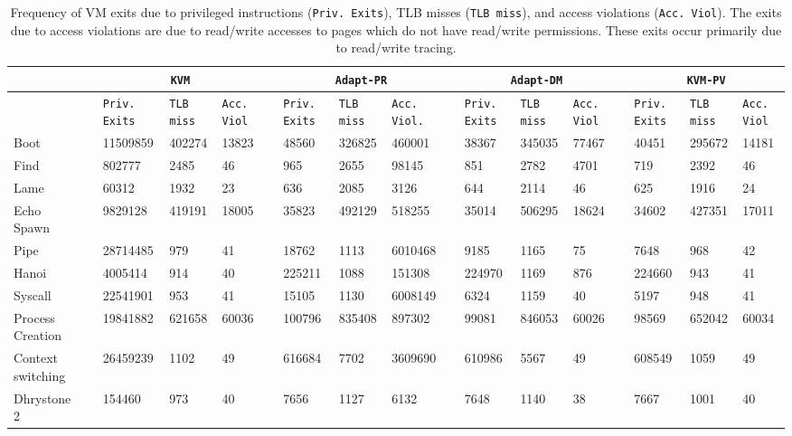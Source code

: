 \begin{center}
\begin{table*}
\centering
\begin{tabular}{
  |p{1.2cm}@{}|@{ }c@{ }|@{}p{0.9cm}|@{}p{1.2cm}|@{}p{1.0cm}@{}|@{ }c@{ }|@{}p{0.8cm}|@{}p{1.2cm}|@{}p{1.0cm}|@{ }c@{ }|@{}p{0.8cm}|@{}p{1.2cm}|@{}p{0.9cm}|@{ }c@{ }|@{}p{0.8cm}|@{}p{1.2cm}|@{}p{0.9cm}@{}|} \hline
	         &  & \multicolumn{3}{c|}{\tt KVM}& & \multicolumn{3}{c|}{\tt Adapt-PR} & & \multicolumn{3}{c|}{\tt Adapt-DM} & & \multicolumn{3}{c|}{\tt KVM-PV} \\ \hline

           &&{\tt Priv. Exits}&{\tt TLB miss}&{\tt Acc. Viol} &&{\tt Priv. Exits}&{\tt TLB miss}&{\tt Acc. Viol.}&&{\tt Priv. Exits}&{\tt TLB miss}&{\tt Acc. Viol}&&{\tt Priv. Exits}&{\tt TLB miss}&{\tt Acc. Viol} \\ \hline  
Boot	&&	11509859	&	402274	&	13823	&&	48560	&	326825	&	460001	&&	38367	&	345035	&	77467	&&	40451	&	295672	&	14181	\\	\hline
Find	&&	802777	&	2485	&	46	&&	965	&	2655	&	98145	&&	851	&	2782	&	4701	&&	719	&	2392	&	46	\\	\hline
Lame	&&	60312	&	1932	&	23	&&	636	&	2085	&	3126	&&	644	&	2114	&	46	&&	625	&	1916	&	24	\\	\hline
Echo Spawn	&&	9829128	&	419191	&	18005	&&	35823	&	492129	&	518255	&&	35014	&	506295	&	18624	&&	34602	&	427351	&	17011	\\	\hline
Pipe 	&&	28714485	&	979	&	41	&&	18762	&	1113	&	6010468	&&	9185	&	1165	&	75	&&	7648	&	968	&	42	\\	\hline
Hanoi	&&	4005414	&	914	&	40	&&	225211	&	1088	&	151308	&&	224970	&	1169	&	876	&&	224660	&	943	&	41	\\	\hline
Syscall	&&	22541901	&	953	&	41	&&	15105	&	1130	&	6008149	&&	6324	&	1159	&	40	&&	5197	&	948	&	41	\\	\hline
Process Creation	&&	19841882	&	621658	&	60036	&&	100796	&	835408	&	897302	&&	99081	&	846053	&	60026	&&	98569	&	652042	&	60034	\\	\hline
Context switching	&&	26459239	&	1102	&	49	&&	616684	&	7702	&	3609690	&&	610986	&	5567	&	49	&&	608549	&	1059	&	49	\\	\hline
Dhrystone 2	&&	154460	&	973	&	40	&&	7656	&	1127	&	6132	&&	7648	&	1140	&	38	&&	7667	&	1001	&	40	\\	\hline
      \end{tabular}
\caption{\label{tab:vm_exit_stats}Frequency of VM exits due to privileged instructions ({\tt Priv. Exits}), TLB misses ({\tt TLB miss}), and access violations ({\tt Acc. Viol}). The
exits due to access violations are due to read/write accesses to pages which do not have read/write permissions. These exits occur primarily due to read/write tracing.}
\end{table*} 
\end{center}


